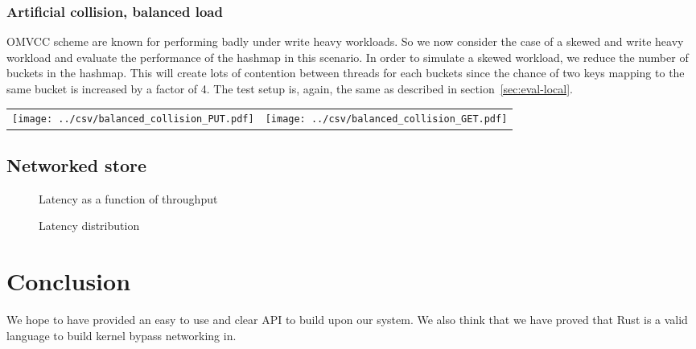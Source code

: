 \documentclass[11pt]{book}
\begin{document}
\subsection{Artificial collision, balanced load}

OMVCC scheme are known for performing badly under write heavy
workloads. So we now consider the case of a skewed and write heavy
workload and evaluate the performance of the hashmap in this
scenario. In order to simulate a skewed workload, we reduce the number
of buckets in the hashmap. This will create lots of contention between
threads for each buckets since the chance of two keys mapping to the
same bucket is increased by a factor of 4. The test setup is, again,
the same as described in section~\ref{sec:eval-local}.

\begin{center}
  \begin{tabular}{c c} \label{table:col-balanced}
    \texttt{[image: ../csv/balanced\_collision\_PUT.pdf]}
    &
      \texttt{[image: ../csv/balanced\_collision\_GET.pdf]}
  \end{tabular}
\end{center}

\section{Networked store}

\begin{figure}[htb!]
  \caption{Latency as a function of throughput}
  \label{fig:latency-throughput}
\end{figure}

\begin{figure}[htb!]
  \caption{Latency distribution}
  \label{fig:latency-distribution}
\end{figure}

\chapter{Conclusion}

We hope to have provided an easy to use and clear API to build upon
our system. We also think that we have proved that Rust is a valid
language to build kernel bypass networking in. 
\end{document}

